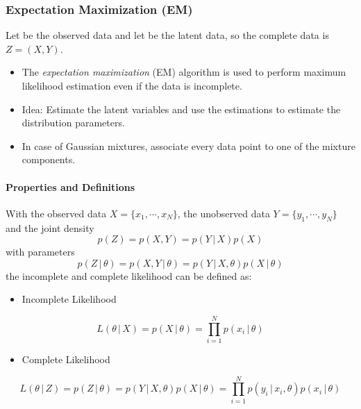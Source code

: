 \documentclass[a4paper, 11pt, accentcolor = tud3b]{tudreport}
\newcommand{\given}{\ensuremath{\,\vert\,}}
\begin{document}
				\subsubsection{Expectation Maximization (EM)} %
					Let  be the observed data and let  be the latent data, so the complete data is \( Z = (X, Y) \).
					\begin{itemize}
						\item The \emph{expectation maximization} (EM) algorithm is used to perform maximum likelihood estimation even if the data is incomplete.
						\item Idea: Estimate the latent variables and use the estimations to estimate the distribution parameters.
						\item In case of Gaussian mixtures, associate every data point to one of the mixture components.
					\end{itemize}

					\paragraph{Properties and Definitions}
						With the observed data \( X = \{ x_1, \cdots, x_N \} \), the unobserved data \( Y = \{ y_1, \cdots, y_N \} \) and the joint density
						\begin{equation}
							p(Z) = p(X, Y) = p(Y \given X) p(X)
						\end{equation}
						with parameters
						\begin{equation}
							p(Z \given \theta) = p(X, Y \given \theta) = p(Y \given X, \theta) p(X \given \theta)
						\end{equation}
						the incomplete and complete likelihood can be defined as:
						\begin{itemize}
							\item Incomplete Likelihood
						\end{itemize}
						\begin{equation}
							L(\theta \given X) = p(X \given \theta) = \prod_{i = 1}^{N} p(x_i \given \theta)
						\end{equation}
						\begin{itemize}
							\item Complete Likelihood
						\end{itemize}
						\begin{equation}
							L(\theta \given Z) = p(Z \given \theta) = p(Y \given X, \theta) p(X \given \theta) = \prod_{i = 1}^{N} p(y_i \given x_i, \theta) p(x_i \given \theta)
						\end{equation}
\end{document}
